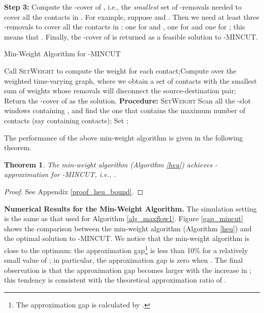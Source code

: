 \documentclass[10pt, conference, letterpaper]{IEEEtran}
\newtheorem{theorem}{Theorem}
\begin{document}
\vspace{1mm}

\noindent  \textbf{Step 3:} Compute the -cover of , i.e., the \emph{smallest} set of -removals needed to cover all the contacts in . For example, suppose  and . Then we need at least three -removals to cover all the contacts in : one for  and , one for  and one for ; this means that . Finally, the -cover of  is returned as a feasible solution to -MINCUT.



\begin{algorithm}[ht]
 \caption{Min-Weight Algorithm for -MINCUT}\label{heu}
    \begin{algorithmic}[1]
\STATE Call \textsc{SetWeight} to compute the weight for each contact;\STATE Compute  over the weighted time-varying graph, where we obtain a set of contacts  with the smallest sum of weights whose removals will disconnect the source-destination pair;
\STATE Return the -cover of  as the solution.
\STATE \textbf{Procedure:} \textsc{SetWeight}
\STATE Scan all the -slot windows containing , and find the one that contains the maximum number of contacts (say containing  contacts);
\STATE Set ;
\ENDFOR
\end{algorithmic}
\end{algorithm}

The performance of the above min-weight algorithm is given in the following theorem.
\begin{theorem}\label{heu_bound}
The min-weight algorithm (Algorithm \ref{heu}) achieves -approximation for -MINCUT, i.e., .
\end{theorem}
\begin{proof}
See Appendix \ref{proof_heu_bound}.
\end{proof}

\noindent \textbf{Numerical Results for the Min-Weight Algorithm.} The simulation setting is the same as that used for Algorithm \ref{alg_maxflow1}. Figure \ref{gap_mincut} shows the comparison between the min-weight algorithm (Algorithm \ref{heu}) and the optimal solution to -MINCUT.
We notice that the min-weight algorithm is close to the optimum: the approximation gap\footnote{The approximation gap is calculated by .} is less than 10\% for a relatively small value of ; in particular, the approximation gap is zero when . The final observation is that the approximation gap becomes larger with the increase in ; this tendency is consistent with the theoretical approximation ratio of .
\end{document}
